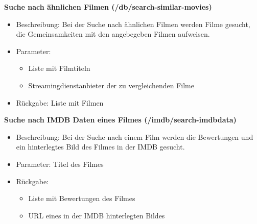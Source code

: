 \documentclass[conference]{IEEEtran}
\begin{document}
\smallskip

\textbf{Suche nach ähnlichen Filmen (/db/search-similar-movies)}
\begin{itemize}
\item Beschreibung:
    Bei der Suche nach ähnlichen Filmen werden Filme gesucht, die Gemeinsamkeiten mit den angebegeben Filmen aufweisen.
\item Parameter:
    \begin{itemize}
    \item Liste mit Filmtiteln
    \item Streamingdienstanbieter der zu vergleichenden Filme
    \end{itemize}
\item Rückgabe:
    Liste mit Filmen
\end{itemize}

\smallskip

\textbf{Suche nach IMDB Daten eines Filmes (/imdb/search-imdbdata)}
\begin{itemize}
\item Beschreibung:
    Bei der Suche nach einem Film werden die Bewertungen und ein hinterlegtes Bild des Filmes in der IMDB gesucht.
\item Parameter:
    Titel des Filmes
\item Rückgabe:
    \begin{itemize}
    \item Liste mit Bewertungen des Filmes
    \item URL eines in der IMDB hinterlegten Bildes
    \end{itemize}
\end{itemize}

\smallskip
\end{document}
